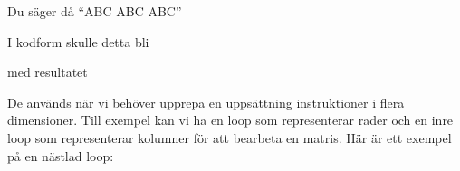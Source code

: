 Du säger då ``ABC ABC ABC''

I kodform skulle detta bli

\hypertarget{cb1}{}
\begin{Shaded}
\begin{Highlighting}[]
\OperatorTok{[]}\OperatorTok{=} \OperatorTok{\{}\OperatorTok{,} \OperatorTok{,} \OperatorTok{\};}

\OperatorTok{(}\OperatorTok{=} \OperatorTok{;}\OperatorTok{\textless{}} \OperatorTok{;}\OperatorTok{++)} \OperatorTok{\{}
    \OperatorTok{(}\OperatorTok{)} \OperatorTok{\{}
        \OperatorTok{(}\OperatorTok{);}
    \OperatorTok{\}}
\OperatorTok{(}\CharTok{\textquotesingle{} \textquotesingle{}}\OperatorTok{);}
\OperatorTok{\}}
\end{Highlighting}
\end{Shaded}

med resultatet

\begin{Shaded}
\begin{Highlighting}[]
\end{Highlighting}
\end{Shaded}

De används när vi behöver upprepa en uppsättning instruktioner i flera
dimensioner. Till exempel kan vi ha en loop som representerar rader och
en inre loop som representerar kolumner för att bearbeta en matris. Här
är ett exempel på en nästlad loop:

\hypertarget{cb3}{}
\begin{Shaded}
\begin{Highlighting}[]
 \OperatorTok{(}\OperatorTok{=} \OperatorTok{;}\OperatorTok{\textless{}=} \OperatorTok{;}\OperatorTok{++)} \OperatorTok{\{}
     \OperatorTok{(}\OperatorTok{=} \OperatorTok{;}\OperatorTok{\textless{}=} \OperatorTok{;}\OperatorTok{++)} \OperatorTok{\{}
        \OperatorTok{(} \OperatorTok{+}\OperatorTok{+}  \OperatorTok{+}\OperatorTok{);}
    \OperatorTok{\}}
\OperatorTok{\}}
\end{Highlighting}
\end{Shaded}

